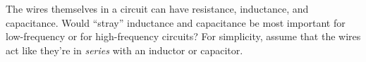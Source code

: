         The wires themselves in a circuit can have resistance,
        inductance, and capacitance. Would ``stray'' inductance and
        capacitance be most important for low-frequency or for
        high-frequency circuits? For simplicity, assume that the
        wires act like they're in \emph{series} with an inductor or capacitor.
